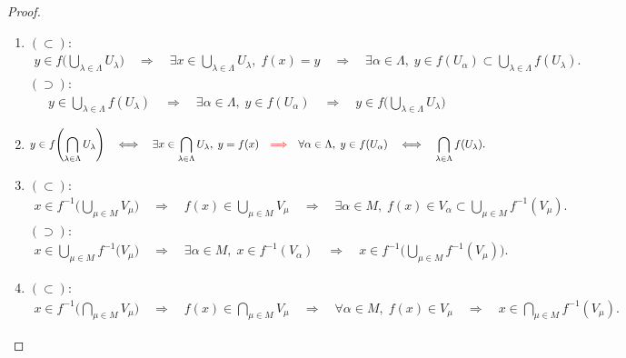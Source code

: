 \documentclass[geometry_main]{subfiles}
\begin{document}
\begin{proof}
    \begin{enumerate}
        \item $\bm{(\subset):}$
        \begin{align}
            y \in f \Biggl(\bigcup_{\lambda \in \Lambda} U_\lambda\Biggr)\quad \Longrightarrow\quad \exists x \in \bigcup_{\lambda \in \Lambda} U_\lambda,\; f(x) = y\quad \Longrightarrow\quad \exists \alpha \in \Lambda,\; y \in f(U_\alpha) \subset \bigcup_{\lambda \in \Lambda} f(U_\lambda).
        \end{align}
        $\bm{(\supset):}$
        \begin{align}
            y \in \bigcup_{\lambda \in \Lambda} f(U_\lambda) \quad \Longrightarrow\quad \exists \alpha \in \Lambda,\; y \in f(U_\alpha)\quad \Longrightarrow \quad y \in f\Biggl(\bigcup_{\lambda \in \Lambda} U_\lambda\Biggr)
        \end{align}
        \item 
        \begin{align}
            y \in f\Biggl(\bigcap_{\lambda \in \Lambda} U_\lambda\Biggr) \quad \Longleftrightarrow \quad \exists x \in \bigcap_{\lambda \in \Lambda} U_\lambda,\; y = f(x)  \quad \textcolor{red}{\Longrightarrow} \quad  \forall \alpha \in \Lambda,\; y \in f(U_\alpha) \quad \Longleftrightarrow \quad \bigcap_{\lambda \in \Lambda} f(U_\lambda).
        \end{align}
        \item $\bm{(\subset):}$
        \begin{align}
            x \in f^{-1} \Biggl(\bigcup_{\mu \in M} V_\mu\Biggr)\quad \Longrightarrow\quad f(x) \in \bigcup_{\mu \in M} V_\mu \quad \Longrightarrow\quad \exists \alpha \in M,\; f(x) \in V_\alpha \subset \bigcup_{\mu \in M} f^{-1}(V_\mu).
        \end{align}
        $\bm{(\supset):}$
        \begin{align}
            x \in \bigcup_{\mu \in M} f^{-1} \bigl(V_\mu\bigr)\quad \Longrightarrow\quad \exists \alpha \in M,\; x \in f^{-1}(V_\alpha) \quad \Longrightarrow\quad x \in f^{-1} \Biggl(\bigcup_{\mu \in M} f^{-1}(V_\mu)\Biggr).
        \end{align}
        \item $\bm{(\subset):}$
        \begin{align}
            x \in f^{-1} \Biggl(\bigcap_{\mu \in M} V_\mu\Biggr)\quad \Longrightarrow\quad f(x) \in \bigcap_{\mu \in M} V_\mu \quad \Longrightarrow\quad \forall \alpha \in M,\; f(x) \in V_\mu\quad \Longrightarrow\quad x \in \bigcap_{\mu \in M} f^{-1}(V_\mu).

\end{align}
\end{enumerate}
\end{proof}
\end{document}
